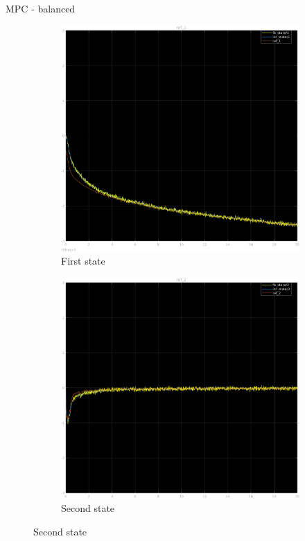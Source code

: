 \documentclass{beamer}
\begin{document}
\begin{frame}{MPC - balanced}
    \begin{figure}
        \centering
        \begin{subfigure}[b]{0.45\textwidth}
            \centering
            \includegraphics[width=\textwidth]{balanced_mpc_1.png}
            \caption{First state}
        \end{subfigure}
        \hfill
        \begin{subfigure}[b]{0.45\textwidth}
            \centering
            \includegraphics[width=\textwidth]{balanced_mpc_2.png}
            \caption{Second state}
        \end{subfigure}
    \end{figure}
\end{frame}
\end{document}
